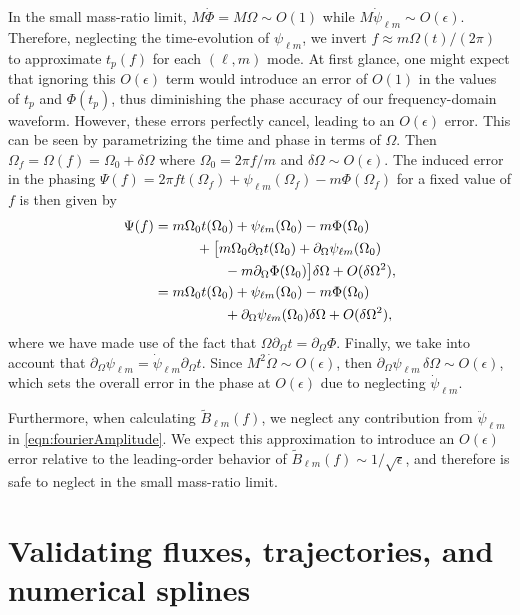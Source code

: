 \documentclass[%
 reprint,
 nofootinbib,
 amsmath,amssymb,
 aps,
 prd,
]{revtex4-2}
\begin{document}
In the small mass-ratio limit, $M\dot{\Phi} = M\Omega \sim O(1)$ while $M \dot{\psi}_{\ell m} \sim O(\epsilon)$. Therefore, neglecting the time-evolution of ${\psi}_{\ell m}$, we invert $f\approx m\Omega(t)/(2\pi)$ to approximate $t_p(f)$ for each $(\ell, m)$ mode. At first glance, one might expect that ignoring this $O(\epsilon)$ term would introduce an error of $O(1)$ in the values of $t_p$ and $\Phi(t_p)$, thus diminishing the phase accuracy of our frequency-domain waveform. However, these errors perfectly cancel, leading to an $O(\epsilon)$ error. This can be seen by parametrizing the time and phase in terms of $\Omega$. Then $\Omega_f = \Omega(f) = \Omega_0 + \delta\Omega$ where $\Omega_0 = 2\pi f/m$ and $\delta\Omega \sim O(\epsilon)$. The induced error in the phasing $\Psi(f) = 2\pi f t(\Omega_f) + \psi_{\ell m}(\Omega_f) - m\Phi(\Omega_f)$ for a fixed value of $f$ is then given by
\begin{align}
    \Psi(f) &=
    m\Omega_0 t(\Omega_0) + \psi_{\ell m}(\Omega_0) - m\Phi(\Omega_0) 
    \\ \notag
    & \quad \qquad + \big[m\Omega_0 \partial_\Omega t(\Omega_0) + \partial_\Omega\psi_{\ell m}(\Omega_0) 
    \\ \notag
    & \quad \qquad \qquad - m\partial_\Omega\Phi(\Omega_0)\big]\delta \Omega + O(\delta\Omega^2),
    \\
    &=
    m\Omega_0 t(\Omega_0) + \psi_{\ell m}(\Omega_0) - m\Phi(\Omega_0) 
    \\ \notag
    & \quad \qquad \qquad + \partial_\Omega\psi_{\ell m}(\Omega_0) \delta \Omega + O(\delta\Omega^2),
\end{align}
where we have made use of the fact that 
$\Omega \partial_\Omega t = \partial_\Omega \Phi$. Finally, we take into account that $\partial_\Omega \psi_{\ell m} = \dot{\psi}_{\ell m}\partial_\Omega t$. Since $M^2 \dot{\Omega} \sim O(\epsilon)$, then $\partial_\Omega \psi_{\ell m} \, \delta \Omega \sim O(\epsilon)$, which sets the overall error in the phase at $O(\epsilon)$ due to neglecting $\dot{\psi}_{\ell m}$.

Furthermore, when calculating $\tilde{B}_{\ell m}(f)$, we neglect any contribution from $\ddot{\psi}_{\ell m}$ in \eqref{eqn:fourierAmplitude}. We expect this approximation to introduce an $O(\epsilon)$ error relative to the leading-order behavior of $\tilde{B}_{\ell m}(f) \sim 1/\sqrt{\epsilon}$, and therefore is safe to neglect in the small mass-ratio limit.

\section{Validating fluxes, trajectories, and numerical splines}
\label{app:tests}
\end{document}
